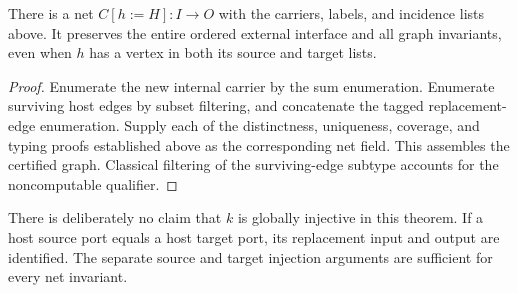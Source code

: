 \begin{theorem}\label{term:shallow-plugging}
There is a net $C[h:=H]:I\to O$ with the carriers, labels, and incidence lists
above. It preserves the entire ordered external interface and all graph invariants,
even when $h$ has a vertex in both its source and target lists.
\end{theorem}
\begin{proof}
Enumerate the new internal carrier by the sum enumeration. Enumerate surviving
host edges by subset filtering, and concatenate the tagged replacement-edge
enumeration. Supply each of the distinctness, uniqueness, coverage, and typing
proofs established above as the corresponding net field. This assembles the
certified graph. Classical filtering of the surviving-edge subtype accounts for
the noncomputable qualifier.
\end{proof}
There is deliberately no claim that $k$ is globally injective in this theorem.
If a host source port equals a host target port, its replacement input and output
are identified. The separate source and target injection arguments are sufficient
for every net invariant.
